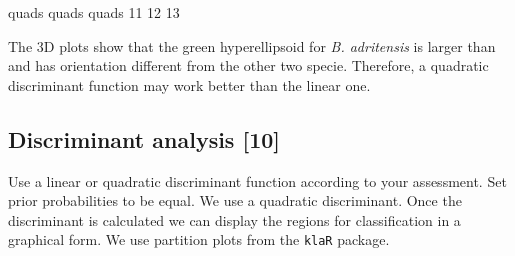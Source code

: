 \documentclass{article}
\begin{document}
\begin{Schunk}
\begin{Soutput}
quads quads quads 
   11    12    13 
\end{Soutput}
\end{Schunk}

The 3D plots show that the green hyperellipsoid for \emph{B. adritensis} is larger than and has orientation different from the other two specie. Therefore, a quadratic discriminant function may work better than the linear one.

\subsection{Discriminant analysis [10]}

Use a linear or quadratic discriminant function according to your assessment. Set prior probabilities to be equal.
We use a quadratic discriminant. Once the discriminant is calculated we can display the regions for classification in a graphical form. We use partition plots from the \verb!klaR! package.
\end{document}
